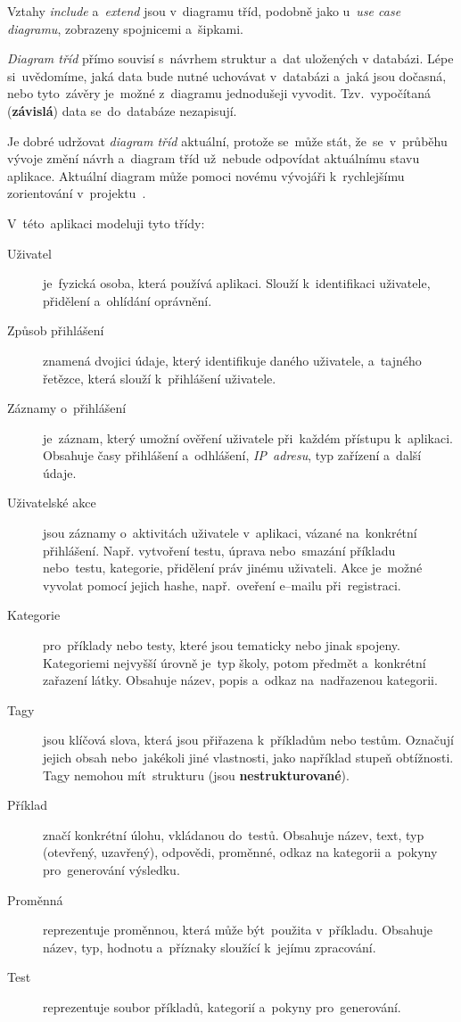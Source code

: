 \documentclass[11pt,a4paper]{report}
\begin{document}
                Vztahy \emph{include} a~\emph{extend} jsou v~diagramu tříd, podobně jako u~\emph{use case diagramu}, zobrazeny spojnicemi a~šipkami.

                \emph{Diagram tříd} přímo souvisí s~návrhem struktur a~dat uložených v databázi. Lépe si~uvědomíme, jaká data bude nutné uchovávat v~databázi a~jaká jsou dočasná, nebo tyto~závěry je~možné z~diagramu jednodušeji vyvodit. Tzv.~vypočítaná (\textbf{závislá}) data se~do~databáze nezapisují.

                Je dobré udržovat \emph{diagram tříd} aktuální, protože se~může stát, že~se~v~průběhu vývoje změní návrh a~diagram tříd už~nebude odpovídat aktuálnímu stavu aplikace. Aktuální diagram může pomoci novému vývojáři k~rychlejšímu zorientování v~projektu~\cite{visualparadigmClassDiagram}.

                
                V~této~aplikaci modeluji tyto třídy:

                \begin{description}
                    \item[Uživatel] je~fyzická osoba, která používá aplikaci. Slouží k~identifikaci uživatele, přidělení a~ohlídání oprávnění.
                    \item[Způsob přihlášení] znamená dvojici údaje, který identifikuje daného uživatele, a~tajného řetězce, která slouží k~přihlášení uživatele.
                    \item[Záznamy o~přihlášení] je~záznam, který umožní ověření uživatele při~každém přístupu k~aplikaci. Obsahuje časy přihlášení a~odhlášení, \emph{IP~adresu}, typ zařízení a~další údaje.
                    \item[Uživatelské akce] jsou záznamy o~aktivitách uživatele v~aplikaci, vázané na~konkrétní přihlášení. Např. vytvoření testu, úprava nebo~smazání příkladu nebo~testu, kategorie, přidělení práv jinému uživateli. Akce je~možné vyvolat pomocí jejich hashe, např.~oveření e--mailu při~registraci.
                    \item[Kategorie] pro~příklady nebo testy, které jsou tematicky nebo jinak spojeny. Kategoriemi nejvyšší úrovně je~typ školy, potom předmět a~konkrétní zařazení látky. Obsahuje název, popis a~odkaz na~nadřazenou kategorii.
                    \item[Tagy] jsou klíčová slova, která jsou přiřazena k~příkladům nebo testům. Označují jejich obsah nebo~jakékoli jiné vlastnosti, jako například stupeň obtížnosti. Tagy nemohou mít~strukturu (jsou \textbf{nestrukturované}).
                    \item[Příklad] značí konkrétní úlohu, vkládanou do~testů. Obsahuje název, text, typ (otevřený, uzavřený), odpovědi, proměnné, odkaz na kategorii a~pokyny pro~generování výsledku.
                    \item[Proměnná] reprezentuje proměnnou, která může být~použita v~příkladu. Obsahuje název, typ, hodnotu a~příznaky sloužící k~jejímu zpracování.
                    \item[Test] reprezentuje soubor příkladů, kategorií a~pokyny pro~generování.
                \end{description}
\end{document}
